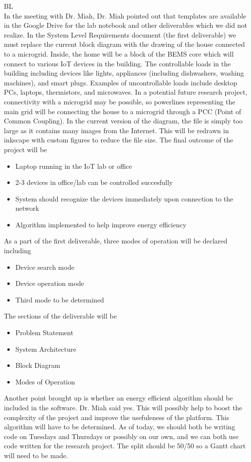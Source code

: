 \documentclass[fontsize=11pt, %
                             paper=letter, %
                             openany, %
                             captions=tableheading,
                             index=totoc,
                             hyperref]{labbook}
\begin{document}
\begin{addmargin}[0cm]{0cm}
BL\\
In the meeting with Dr. Miah, Dr. Miah pointed out that templates are available in the Google Drive for the lab notebook and other deliverables which we did not realize. In the System Level Requirements document (the first deliverable) we must replace the current block diagram with the drawing of the house connected to a microgrid. Inside, the home will be a block of the BEMS core which will connect to various IoT devices in the building. The controllable loads in the building including devices like lights, appliances (including dishwashers, washing machines), and smart plugs. Examples of uncontrollable loads include desktop PCs, laptops, thermistors, and microwaves. In a potential future research project, connectivity with a microgrid may be possible, so powerlines representing the main grid will be connecting the house to a microgrid through a PCC (Point of Common Coupling). In the current version of the diagram, the file is simply too large as it contains many images from the Internet. This will be redrawn in inkscape with custom figures to reduce the file size.
\smallbreak\noindent
The final outcome of the project will be
\begin{itemize}
\item Laptop running in the IoT lab or office
\item 2-3 devices in office/lab can be controlled succesfully
\item System should recognize the devices immediately upon connection to the network
\item Algorithm implemented to help improve energy efficiency
\end{itemize}
As a part of the first deliverable, three modes of operation will be declared including
\begin{itemize}
\item Device search mode
\item Device operation mode
\item Third mode to be determined
\end{itemize}
The sections of the deliverable will be
\begin{itemize}
\item Problem Statement
\item System Architecture
\item Block Diagram
\item Modes of Operation
\end{itemize}
Another point brought up is whether an energy efficient algorithm should be included in the software. Dr. Miah said yes. This will possibly help to boost the complexity of the project and improve the usefuleness of the platform. This algorithm will have to be determined.
\smallbreak\noindent
As of today, we should both be writing code on Tuesdays and Thursdays or possibly on our own, and we can both use code written for the research project. The split should be 50/50 so a Gantt chart will need to be made. 


\end{addmargin}
\end{document}
